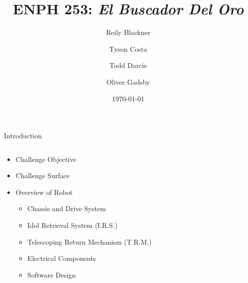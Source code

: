 \documentclass[aspectratio=43]{beamer}
\title{ENPH 253: \textit{El Buscador Del Oro}}
\date{\today}
\author{Reily Blackner \and Tyson Costa\\ \and Todd Darcie \and Oliver Gadsby}
\institute[UBC]{University of British Columbia}
\begin{document}
  \begin{frame}
    \titlepage
  \end{frame} 
  

  \begin{frame}{Introduction}
    \begin{columns}[c]
      \begin{column}[c]{5cm}
        \begin{itemize}
          \item Challenge Objective
          \item Challenge Surface
          \item Overview of Robot
            \begin{itemize}
              \item Chassis and Drive System
              \item Idol Retrieval System (I.R.S.)
              \item Telescoping Return Mechanism (T.R.M.)
              \item Electrical Components
              \item Software Design
            \end{itemize}
        \end{itemize}
      \end{column}
    \end{columns}
  \end{frame} 
  
\end{document}
